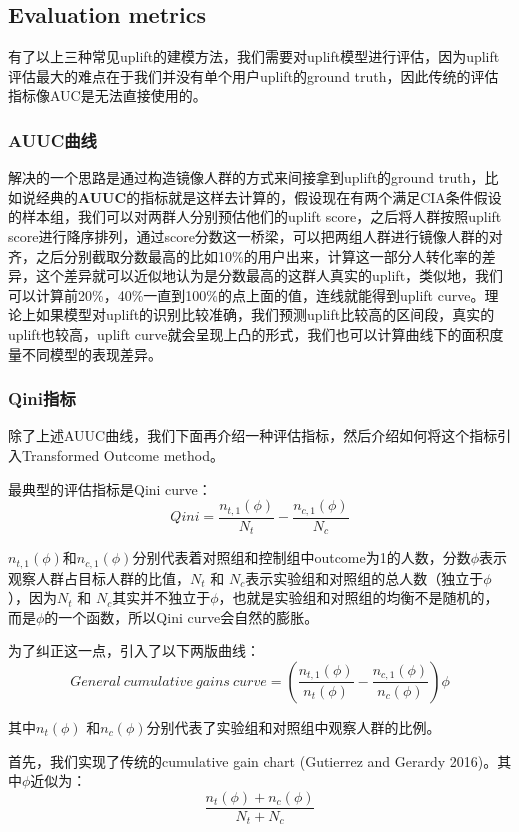 \documentclass[12pt]{article}
\begin{document}
\subsection{Evaluation metrics}
有了以上三种常见uplift的建模方法，我们需要对uplift模型进行评估，因为uplift评估最大的难点在于我们并没有单个用户uplift的ground truth，因此传统的评估指标像AUC是无法直接使用的。

\subsubsection{AUUC曲线}
解决的一个思路是通过构造镜像人群的方式来间接拿到uplift的ground truth，比如说经典的\textbf{AUUC}的指标就是这样去计算的，假设现在有两个满足CIA条件假设的样本组，我们可以对两群人分别预估他们的uplift score，之后将人群按照uplift score进行降序排列，通过score分数这一桥梁，可以把两组人群进行镜像人群的对齐，之后分别截取分数最高的比如10\%的用户出来，计算这一部分人转化率的差异，这个差异就可以近似地认为是分数最高的这群人真实的uplift，类似地，我们可以计算前20\%，40\%一直到100\%的点上面的值，连线就能得到uplift curve。理论上如果模型对uplift的识别比较准确，我们预测uplift比较高的区间段，真实的uplift也较高，uplift curve就会呈现上凸的形式，我们也可以计算曲线下的面积度量不同模型的表现差异。

\subsubsection{Qini指标}
除了上述AUUC曲线，我们下面再介绍一种评估指标，然后介绍如何将这个指标引入Transformed Outcome method。

最典型的评估指标是Qini curve：
$$
Qini = \frac{n_{t,1}(\phi)}{N_t} - \frac{n_{c,1}(\phi)}{N_c}
$$

$n_{t,1}(\phi)$和$n_{c,1}(\phi)$分别代表着对照组和控制组中outcome为1的人数，分数$\phi$表示观察人群占目标人群的比值，$N_t$ 和 $N_c$表示实验组和对照组的总人数（独立于$\phi$），因为$N_t$ 和 $N_c$其实并不独立于$\phi$，也就是实验组和对照组的均衡不是随机的，而是$\phi$的一个函数，所以Qini curve会自然的膨胀。

为了纠正这一点，引入了以下两版曲线：
$$
General \ cumulative \ gains \ curve =  (\frac{n_{t,1}(\phi)}{n_t(\phi)} - \frac{n_{c,1}(\phi)}{n_c(\phi)})\phi
$$

其中$n_t(\phi)$ 和$n_c(\phi)$分别代表了实验组和对照组中观察人群的比例。

首先，我们实现了传统的cumulative gain chart (Gutierrez and Gerardy 2016)。其中$\phi$近似为：
$$
\frac{n_t(\phi) + n_c(\phi)}{N_t + N_c}
$$
\end{document}
